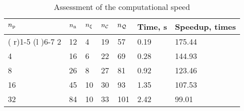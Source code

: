 \begin{table}[t]
  \centering
  \caption{Assessment of the computational speed}
  \vspace{-0.5em}
  \begin{tabular*}{1\linewidth}{R{10pt}R{16pt}R{16pt}R{16pt}R{16pt}R{44pt}R{49pt}}
    \toprule
    ${n_\text{p}}$ & ${n_\text{n}}$ & ${n_\xi}$ & ${n_\mathcal{C}}$ & ${n_\mathcal{Q}}$ & Time, s & Speedup, times \\
    \cmidrule( r){1-5}
    \cmidrule(l ){6-7}
     2 & 12 &  4 & 19 &  57 & 0.19 & 175.44 \\
     4 & 16 &  6 & 22 &  69 & 0.28 & 144.93 \\
     8 & 26 &  8 & 27 &  81 & 0.92 & 123.46 \\
    16 & 45 & 10 & 30 &  93 & 1.35 & 107.53 \\
    32 & 84 & 10 & 33 & 101 & 2.42 &  99.01 \\
    \bottomrule
  \end{tabular*}
\end{table}
